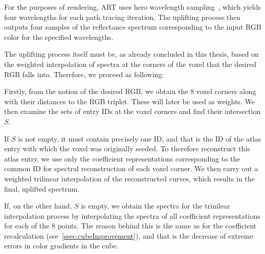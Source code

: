 For the purposes of rendering, ART uses hero wavelength sampling~\cite{heroWavelengthSampling}, which yields four wavelengths for each path tracing iteration. The uplifting process then outputs four samples of the reflectance spectrum corresponding to the input RGB color for the specified wavelengths.

The uplifting process itself must be, as already concluded in this thesis, based on the weighted interpolation of spectra at the corners of the voxel that the desired RGB falls into. Therefore, we proceed as following:

Firstly, from the notion of the desired RGB, we obtain the 8 voxel corners along with their distances to the RGB triplet. These will later be used as weights. We then examine the sets of entry IDs at the voxel corners and find their intersection $S$.

If $S$ is not empty, it must contain precisely one ID, and that is the ID of the atlas entry with which the voxel was originally seeded. To therefore reconstruct this atlas entry, we use only the coefficient representations corresponding to the common ID for spectral reconstruction of each voxel corner. We then carry out a weighted trilinear interpolation of the reconstructed curves, which results in the final, uplifted spectrum.

If, on the other hand, $S$ is empty, we obtain the spectra for the trinilear interpolation process by interpolating the spectra of all coefficient representations for each of the 8 points. The reason behind this is the same as for the coefficient recalculation (see~\cref{ssec:cubeImprovement}), and that is the decrease of extreme errors in color gradients in the cube.